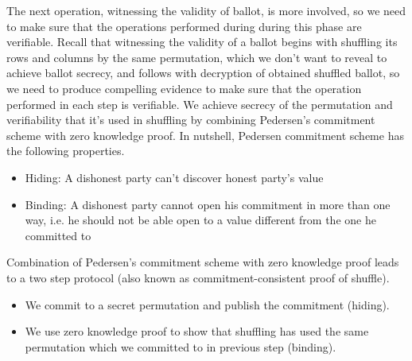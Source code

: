 \documentclass{llncs}
\begin{document}
The next operation, witnessing the validity of ballot, 
is more involved, so we need to make 
sure that the operations performed during during this phase are verifiable. 
Recall that witnessing 
the validity of a ballot begins with shuffling its rows and columns 
by the same permutation, which
we don't want to reveal to achieve ballot secrecy, and follows with 
decryption  of obtained shuffled ballot, so 
we need to produce compelling evidence 
to make sure that the operation performed in each step 
is verifiable. We achieve secrecy of the permutation and 
verifiability that it's used in shuffling by combining 
Pedersen's commitment \cite{Pederson} scheme with zero knowledge proof.
In nutshell, Pedersen commitment scheme has 
the following properties. 
\begin{itemize}
\item Hiding: A dishonest party can't discover honest party's value 
\item Binding: A dishonest party cannot open his commitment in more  
	 	than one way, i.e. he should not be able open to a value 
	 	different from the one he committed to 
\end{itemize}

Combination of Pedersen's commitment scheme 
with zero knowledge proof leads to a two step protocol (also known 
as commitment-consistent proof of shuffle).
\begin{itemize}
\item We commit to a secret permutation and publish the commitment (hiding).
\item We use zero knowledge proof to show that shuffling has used 
      the same permutation which we committed to in previous step (binding).
\end{itemize}  
\end{document}
